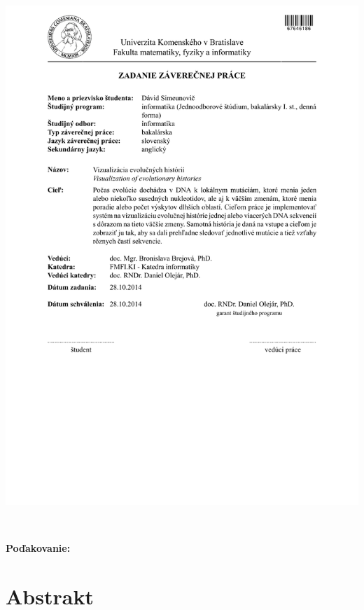 \documentclass[12pt,oneside]{book}
\begin{document}
\newpage 
\thispagestyle{empty}
\hspace{-2cm}\includegraphics[width=1.1\textwidth]{images/zadanie}


\frontmatter

\setcounter{page}{3}
\newpage 
~

\vfill
{\bf Poďakovanie:}



\newpage 
\section*{Abstrakt}
\end{document}
